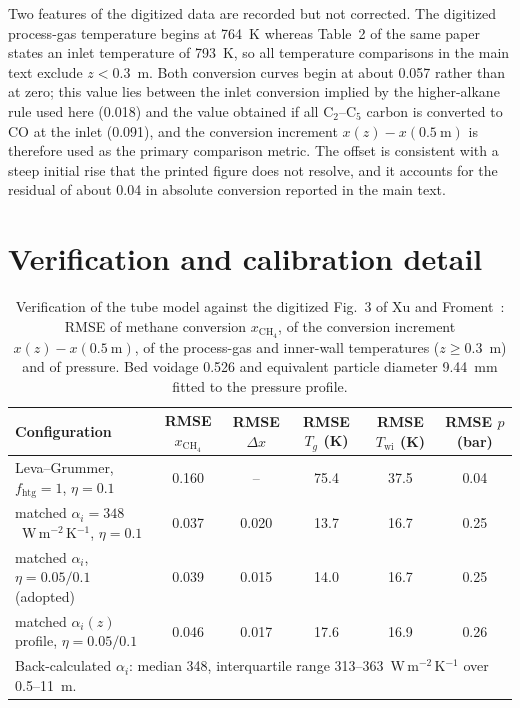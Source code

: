 \documentclass[final,3p,times]{elsarticle}
\newcommand{\ce}[1]{\mathrm{#1}}
\begin{document}
Two features of the digitized data are recorded but not corrected. The digitized process-gas temperature begins at 764~K whereas Table~2 of the same paper states an inlet temperature of 793~K, so all temperature comparisons in the main text exclude $z < 0.3$~m. Both conversion curves begin at about 0.057 rather than at zero; this value lies between the inlet conversion implied by the higher-alkane rule used here (0.018) and the value obtained if all C$_2$--C$_5$ carbon is converted to CO at the inlet (0.091), and the conversion increment $x(z) - x(0.5~\mathrm{m})$ is therefore used as the primary comparison metric. The offset is consistent with a steep initial rise that the printed figure does not resolve, and it accounts for the residual of about 0.04 in absolute conversion reported in the main text.

\section{Verification and calibration detail}
\label{sec:verifdetail}

\begin{table}[t]
\centering\footnotesize
\caption{Verification of the tube model against the digitized Fig.~3 of Xu and Froment~\cite{xu1989b}: RMSE of methane conversion $x_{\ce{CH_4}}$, of the conversion increment $x(z) - x(0.5~\mathrm{m})$, of the process-gas and inner-wall temperatures ($z \geq 0.3$~m) and of pressure. Bed voidage 0.526 and equivalent particle diameter 9.44~mm fitted to the pressure profile.}
\label{tab:xf}
\begin{tabular}{lccccc}
\toprule
Configuration & RMSE $x_{\ce{CH_4}}$ & RMSE $\Delta x$ & RMSE $T_g$ (K) & RMSE $T_{\mathrm{wi}}$ (K) & RMSE $p$ (bar) \\
\midrule
Leva--Grummer, $f_{\mathrm{htg}}=1$, $\eta = 0.1$ & 0.160 & -- & 75.4 & 37.5 & 0.04 \\
matched $\alpha_i = 348$~W\,m$^{-2}$\,K$^{-1}$, $\eta = 0.1$ & 0.037 & 0.020 & 13.7 & 16.7 & 0.25 \\
matched $\alpha_i$, $\eta = 0.05/0.1$ (adopted) & 0.039 & 0.015 & 14.0 & 16.7 & 0.25 \\
matched $\alpha_i(z)$ profile, $\eta = 0.05/0.1$ & 0.046 & 0.017 & 17.6 & 16.9 & 0.26 \\
\bottomrule
\multicolumn{6}{l}{\scriptsize Back-calculated $\alpha_i$: median 348, interquartile range 313--363~W\,m$^{-2}$\,K$^{-1}$ over 0.5--11~m.}
\end{tabular}
\end{table}
\end{document}
